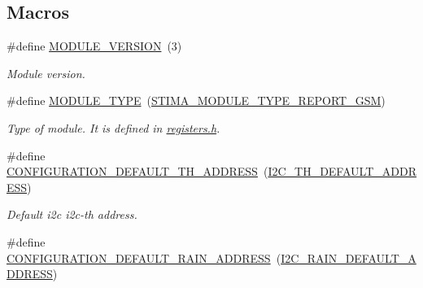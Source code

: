 \subsection*{Macros}
\begin{DoxyCompactItemize}
\item 
\mbox{\label{rmap-config_8h_aa8639a8d4e83d9cc4187d7a751228464}} 
\#define \hyperlink{rmap-config_8h_aa8639a8d4e83d9cc4187d7a751228464}{M\+O\+D\+U\+L\+E\+\_\+\+V\+E\+R\+S\+I\+ON}~(3)
\begin{DoxyCompactList}\small\item\em Module version. \end{DoxyCompactList}\item 
\mbox{\label{rmap-config_8h_a8c815d03b3fd3e18ca06f920a1eb4e8e}} 
\#define \hyperlink{rmap-config_8h_a8c815d03b3fd3e18ca06f920a1eb4e8e}{M\+O\+D\+U\+L\+E\+\_\+\+T\+Y\+PE}~(\hyperlink{stima__module_8h_aea131800c42cd2037b9a227f49d65872}{S\+T\+I\+M\+A\+\_\+\+M\+O\+D\+U\+L\+E\+\_\+\+T\+Y\+P\+E\+\_\+\+R\+E\+P\+O\+R\+T\+\_\+\+G\+SM})
\begin{DoxyCompactList}\small\item\em Type of module. It is defined in \hyperlink{registers_8h}{registers.\+h}. \end{DoxyCompactList}\item 
\mbox{\label{rmap-config_8h_a413cd84e34db40559ab834cc89408cdb}} 
\#define \hyperlink{rmap-config_8h_a413cd84e34db40559ab834cc89408cdb}{C\+O\+N\+F\+I\+G\+U\+R\+A\+T\+I\+O\+N\+\_\+\+D\+E\+F\+A\+U\+L\+T\+\_\+\+T\+H\+\_\+\+A\+D\+D\+R\+E\+SS}~(\hyperlink{registers-th_8h_a66906eb81e92beab5f2076ac49996132}{I2\+C\+\_\+\+T\+H\+\_\+\+D\+E\+F\+A\+U\+L\+T\+\_\+\+A\+D\+D\+R\+E\+SS})
\begin{DoxyCompactList}\small\item\em Default i2c i2c-\/th address. \end{DoxyCompactList}\item 
\mbox{\label{rmap-config_8h_a682b556c001cdf90f49b3a4d19081fb3}} 
\#define \hyperlink{rmap-config_8h_a682b556c001cdf90f49b3a4d19081fb3}{C\+O\+N\+F\+I\+G\+U\+R\+A\+T\+I\+O\+N\+\_\+\+D\+E\+F\+A\+U\+L\+T\+\_\+\+R\+A\+I\+N\+\_\+\+A\+D\+D\+R\+E\+SS}~(\hyperlink{registers-rain_8h_a2aebb0ca4cdf424c57dee6f591c40e0c}{I2\+C\+\_\+\+R\+A\+I\+N\+\_\+\+D\+E\+F\+A\+U\+L\+T\+\_\+\+A\+D\+D\+R\+E\+SS})

\end{DoxyCompactItemize}
